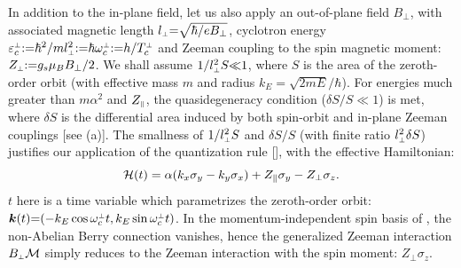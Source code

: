 \documentclass[aps, prb, showpacs, twocolumn, notitlepage, superscriptaddress]{revtex4-1}
\begin{document}
In addition to the in-plane field, let us also apply an out-of-plane field $B_{\perp}$, with associated magnetic length $l_{\scriptscriptstyle{\perp}}{=}\sqrt{\hbar/eB_{\perp}}$, cyclotron energy $\varepsilon^{\scriptscriptstyle{\perp}}_c{:}{=}\hbar^2/ml_{\scriptscriptstyle{\perp}}^2{:}{=}\hbar \omega_c^{\scriptscriptstyle{\perp}}{:}{=}h/T_c^{\scriptscriptstyle{\perp}}$ and Zeeman coupling to the spin magnetic moment:  $Z_{\scriptscriptstyle{\perp}}{:}{=}{g_s}\mu_B B_{\perp}/2$. We shall assume  $1/l_{\scriptscriptstyle{\perp}}^2S{\ll}1$, where $S$ is the area of the zeroth-order orbit (with effective mass $m$ and radius $k_E{=}\sqrt{2mE}/\hbar$). For energies much greater than $m\alpha^2$ and $Z_{\scriptscriptstyle{\parallel}}$, the quasidegeneracy condition ($\delta S/S{\ll}1$) is met, where $\delta S$ is the differential area induced by both spin-orbit and in-plane Zeeman couplings [see (a)].  The smallness of $1/l_{\scriptscriptstyle{\perp}}^2S$ and $\delta S/S$ (with finite ratio $l_{\scriptscriptstyle{\perp}}^2\delta S$) justifies our application of the quantization rule [],  with the effective Hamiltonian: 
\begin{equation}
{\cal H}(t)=\alpha(k_{x}\sigma_{y}-k_{y}\sigma_{x})+Z_\parallel\sigma_{y}-Z_\perp\sigma_{z}.\label{calHRZ}
\end{equation}
$t$ here is a time variable which parametrizes the zeroth-order orbit:
$\boldsymbol{k}(t){=}({-}k_E \cos \omega_c^{\scriptscriptstyle{\perp}} t, k_E \sin \omega_c^{\scriptscriptstyle{\perp}} t )$. In the momentum-independent spin basis of , the non-Abelian Berry connection vanishes, hence the generalized Zeeman interaction $B_{\scriptscriptstyle{\perp}}{\cal M}$ simply reduces to the Zeeman interaction with the spin  moment: $Z_\perp\sigma_{z}$.
\end{document}
